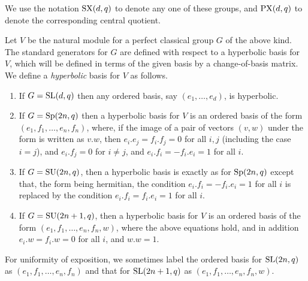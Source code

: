 \documentclass[12pt]{article}
\def\SL{{\rm SL}}
\def\Sp{{\rm Sp}}
\def\SU{{\rm SU}}
\def\SX{{\rm SX}}
\def\PX{{\rm PX}}
\begin{document}
We use the notation $\SX(d,q)$ to denote any  one of these 
groups, and $\PX(d,q)$ to denote the corresponding central quotient.

Let $V$ be the natural module for a perfect classical group $G$ of the
above kind.  The standard generators for $G$ are defined with respect to 
a hyperbolic basis for $V$, which will be defined in terms of the
given basis by a change-of-basis matrix. 
We define a {\it hyperbolic} basis for $V$ as follows. 
\begin{enumerate}
\item 
If $G=\SL(d,q)$ then any ordered basis, say $(e_1, \ldots, e_d)$, is hyperbolic. 

\item 
If $G=\Sp(2n,q)$ then a hyperbolic basis for $V$ is an
ordered basis of the form $(e_1,f_1,\ldots,e_n,f_n)$, where, if the
image of a pair of vectors $(v,w)$ under the form is written as $v.w$,
then $e_i.e_j=f_i.f_j=0$ for all $i,j$ (including the case $i=j$), and
$e_i.f_j=0$ for $i\ne j$, and $e_i.f_i=-f_i.e_i=1$ for all $i$. 

\item 
If $G=\SU(2n,q)$, then a hyperbolic
basis is exactly as
for $\Sp(2n,q)$ except that, the form being hermitian, the
condition  $e_i.f_i=-f_i.e_i=1$ for all $i$ is replaced by the
condition $e_i.f_i=f_i.e_i=1$ for all $i$. 

\item 
If $G=\SU(2n+1,q)$, then a hyperbolic basis for $V$ is 
an ordered basis of the form 
$(e_1,f_1,\ldots,e_n,f_n,w)$, where the above equations hold, and in
addition $e_i.w=f_i.w=0$ for all $i$, and $w.w=1$. 
\end{enumerate}
For uniformity of exposition, we sometimes
label the ordered basis for 
$\SL(2n, q)$ as $(e_1,f_1,\ldots,e_n,f_n)$
and that for $\SL(2n + 1, q)$ 
as $(e_1,f_1,\ldots,e_n,f_n, w)$.
\end{document}

